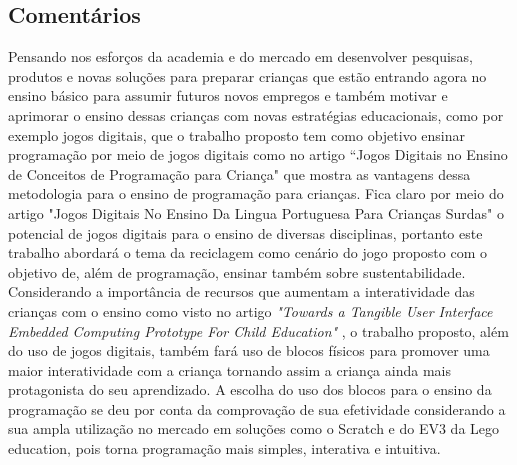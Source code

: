 \subsection{Comentários}
Pensando nos esforços da academia e do mercado em desenvolver pesquisas, produtos e novas soluções para preparar crianças que estão entrando agora no ensino básico para assumir futuros novos empregos e também motivar e aprimorar o ensino dessas crianças com novas estratégias educacionais, como  por exemplo jogos digitais, que o trabalho proposto tem como objetivo ensinar programação por meio de jogos digitais como no artigo “Jogos Digitais no Ensino de Conceitos de Programação para Criança" \cite{tadesco_2016} que mostra as vantagens dessa metodologia para o ensino de programação para crianças. Fica claro por meio do artigo "Jogos Digitais No Ensino Da Lingua Portuguesa Para Crianças Surdas" \cite{liz_2017} o potencial de jogos digitais para o ensino de diversas disciplinas, portanto este trabalho abordará o tema da reciclagem como cenário do jogo proposto com o objetivo de, além de programação, ensinar também sobre sustentabilidade. Considerando a importância de recursos que aumentam a interatividade das crianças com o ensino como visto no artigo \textit{"Towards a Tangible User Interface Embedded Computing Prototype For Child Education"} \cite{carneiro_2018}, o trabalho proposto, além do uso de jogos digitais, também fará uso de blocos físicos para promover uma maior interatividade com a criança tornando assim a criança ainda mais protagonista do seu aprendizado. A escolha do uso dos blocos para o ensino da programação se deu por conta da comprovação de sua efetividade considerando a sua ampla utilização no mercado em soluções como o Scratch e do EV3 da Lego education, pois torna programação mais simples, interativa e intuitiva. 




